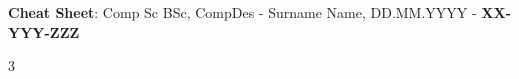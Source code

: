 \documentclass[10pt,landscape, margin = 0.1mm]{article}
\begin{document}
\syntaxonlys

\begin{center}
     \Large{\textbf{Cheat Sheet}: Comp Sc BSc, CompDes - Surname Name, DD.MM.YYYY - \textbf{XX-YYY-ZZZ}} \\
\end{center}
\begin{multicols}{3}
\setlength{\premulticols}{0.5pt}
\setlength{\postmulticols}{0.5pt}
\setlength{\multicolsep}{0.5pt}
\setlength{\columnsep}{0.2pt}
\setlength{\columnseprule}{0pt}



\begin{flushleft}











\end{flushleft}
\end{multicols}

\newpage
\end{document}
